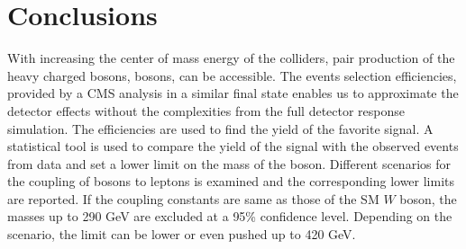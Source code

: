 \section{Conclusions}\label{sec:conclusion} 
With increasing the center of mass energy of the colliders, pair production of the heavy charged bosons, \wprime bosons, can be accessible. The events selection efficiencies, provided by a CMS analysis in a similar final state enables us to approximate the detector effects without the complexities from the full detector response simulation. The efficiencies are used to find the yield of the favorite signal. A statistical tool is used to compare the yield of the signal with the observed events from data and set a lower limit on the mass of the \wprime boson. Different 
scenarios for the coupling of \wprime bosons to leptons is examined and the corresponding lower limits are reported. If the coupling constants are same as those of the SM $W$ boson, the masses up to 290 GeV are excluded at a 95\% confidence level. Depending on the scenario, the limit can be lower or even pushed up to 420 GeV.